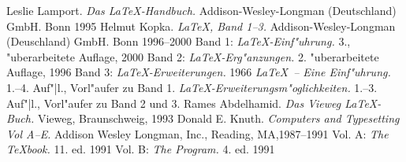 \documentclass{article}
\begin{document}
\begin{thebibliography}{\hspace{1.5cm}}
 Leslie Lamport. \textsl{Das \LaTeX-Handbuch.}
    Addison-Wesley-Longman (Deutschland) GmbH. Bonn 1995
 Helmut Kopka. \textsl{\LaTeX, Band 1--3.} 
    Addison-Wesley-Longman (Deuschland) GmbH. Bonn 1996--2000
 Band 1: \textsl{\LaTeX-Einf"uhrung.} 3., "uberarbeitete
    Auflage, 2000
 Band 2: \textsl{\LaTeX-Erg"anzungen.} 2. "uberarbeitete
    Auflage, 1996
 Band 3: \textsl{\LaTeX-Erweiterungen.} 1966
 \textsl{\LaTeX\ -- Eine Einf"uhrung.} 1.--4. Auf"|l.,
    Vorl"aufer zu Band 1.
 \textsl{\LaTeX-Erweiterungsm"oglichkeiten.} 
    1.--3. Auf"|l., Vorl"aufer zu Band 2 und 3.
 Rames Abdelhamid. \textsl{Das Vieweg \LaTeX-Buch.}
    Vieweg, Braunschweig, 1993
 Donald E. Knuth. \textsl{Computers and Typesetting
    Vol A--E.} Addison Wesley Longman, Inc., Reading, MA,1987--1991
 Vol. A: \textsl{The \TeX book.} 11. ed. 1991
 Vol. B: \textsl{The Program.} 4. ed. 1991
\end{thebibliography}
\end{document}
